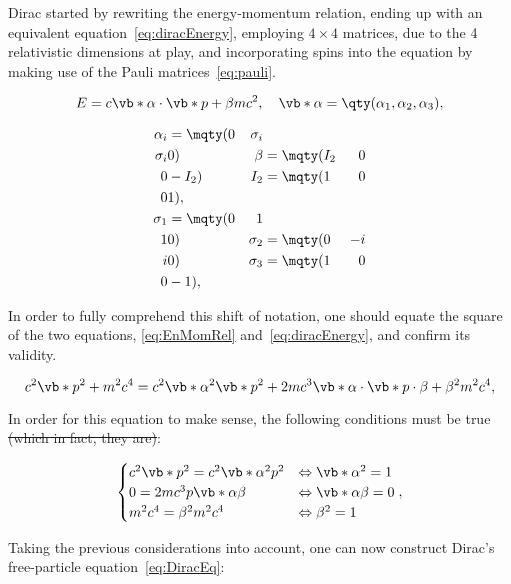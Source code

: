  Dirac started by rewriting the energy-momentum relation, ending up with an equivalent equation~\eqref{eq:diracEnergy}, employing $4\times 4$ matrices, due to the 4 relativistic dimensions at play, and incorporating spins into the equation by making use of the Pauli matrices~\eqref{eq:pauli}.

 \begin{equation}
    E=c\vb*{\alpha}\cdot \vb*{p}+{\beta} mc^2,\quad \vb*{\alpha}=\qty(\alpha_1,\alpha_2,\alpha_3),
    \label{eq:diracEnergy}
 \end{equation}

 \begin{align}
    \alpha_i&=\mqty(0 & {\sigma}_i\\ {\sigma}_i&0) & {\beta}&=\mqty(I_2 & 0 \\ 0 &-I_2) &I_2&=\mqty(1&0\\0&1),\\
    \sigma_1&=\mqty(0&1\\1&0) & \sigma_2&=\mqty(0&-i\\i&0)& \sigma_3&=\mqty(1&0\\0&-1),\label{eq:pauli}
 \end{align}

 In order to fully comprehend this shift of notation, one should equate the square of the two equations, \eqref{eq:EnMomRel} and~\eqref{eq:diracEnergy}, and confirm its validity.

 \begin{equation}
    c^2 \vb*{p}^2 + m^2c^4 = c^2\vb*{\alpha}^2\vb*{p}^2+2 m c^3 \vb*{\alpha}\cdot \vb*{p} \cdot \beta + \beta^2 m^2 c^4,
 \end{equation}

 In order for this equation to make sense, the following conditions must be true \sout{(which in fact, they are)}: 

\begin{gather}
    \begin{cases}
        c^2\vb*{p}^2=c^2\vb*{\alpha}^2 p^2  &\Leftrightarrow \vb*{\alpha}^2=1\\
        0=2mc^3  p \vb*{\alpha} \beta &\Leftrightarrow \vb*{\alpha} \beta =0\\
        m^2c^4=\beta^2 m^2c^4     &\Leftrightarrow \beta^2 =1
    \end{cases},
\end{gather}


Taking the previous considerations into account, one can now construct Dirac's free-particle equation~\eqref{eq:DiracEq}:

